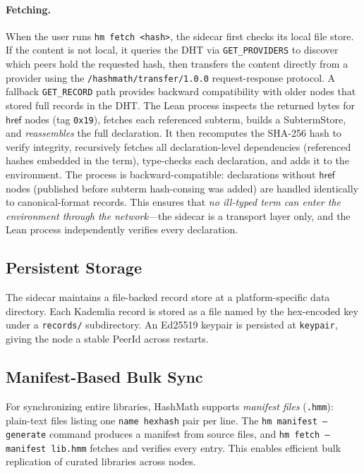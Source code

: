 \documentclass[11pt]{article}
\theoremstyle{definition}
\theoremstyle{plain}
\theoremstyle{remark}
\newcommand{\hrefE}{\textsf{href}}
\begin{document}
\paragraph{Fetching.}
When the user runs \texttt{hm fetch <hash>}, the sidecar first checks its
local file store.
If the content is not local, it queries the DHT via \texttt{GET\_PROVIDERS}
to discover which peers hold the requested hash, then transfers the content
directly from a provider using the \texttt{/hashmath/transfer/1.0.0}
request-response protocol.
A fallback \texttt{GET\_RECORD} path provides backward compatibility with
older nodes that stored full records in the DHT.
The Lean process inspects the returned bytes for $\hrefE$ nodes (tag \texttt{0x19}),
fetches each referenced subterm, builds a \textsf{SubtermStore}, and
\emph{reassembles} the full declaration.
It then recomputes the SHA-256 hash to verify integrity, recursively fetches all
declaration-level dependencies (referenced hashes embedded in the term),
type-checks each declaration, and adds it to the environment.
The process is backward-compatible: declarations without $\hrefE$ nodes
(published before subterm hash-consing was added) are handled identically
to canonical-format records.
This ensures that \emph{no ill-typed term can enter the environment through
the network}---the sidecar is a transport layer only, and the Lean process
independently verifies every declaration.

\subsection{Persistent Storage}

The sidecar maintains a file-backed record store at a platform-specific
data directory.
Each Kademlia record is stored as a file named by the hex-encoded key under a
\texttt{records/} subdirectory.
An Ed25519 keypair is persisted at \texttt{keypair}, giving the node a stable
PeerId across restarts.

\subsection{Manifest-Based Bulk Sync}

For synchronizing entire libraries, HashMath supports \emph{manifest files}
(\texttt{.hmm}): plain-text files listing one \texttt{name hexhash} pair per line.
The \texttt{hm manifest --generate} command produces a manifest from source files,
and \texttt{hm fetch --manifest lib.hmm} fetches and verifies every entry.
This enables efficient bulk replication of curated libraries across nodes.
\end{document}
